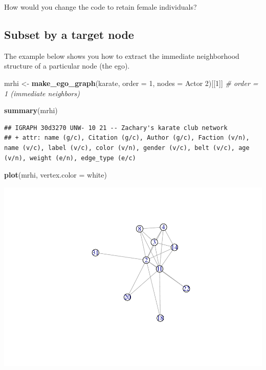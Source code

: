 \documentclass[
]{book}
\newenvironment{Shaded}{\begin{snugshade}}{\end{snugshade}}
\newcommand{\AttributeTok}[1]{\textcolor[rgb]{0.13,0.29,0.53}{#1}}
\newcommand{\CommentTok}[1]{\textcolor[rgb]{0.56,0.35,0.01}{\textit{#1}}}
\newcommand{\DecValTok}[1]{\textcolor[rgb]{0.00,0.00,0.81}{#1}}
\newcommand{\FunctionTok}[1]{\textcolor[rgb]{0.13,0.29,0.53}{\textbf{#1}}}
\newcommand{\NormalTok}[1]{#1}
\newcommand{\OtherTok}[1]{\textcolor[rgb]{0.56,0.35,0.01}{#1}}
\newcommand{\StringTok}[1]{\textcolor[rgb]{0.31,0.60,0.02}{#1}}
\begin{document}
How would you change the code to retain female individuals?

\subsection{Subset by a target node}\label{subset-by-a-target-node}

The example below shows you how to extract the immediate neighborhood structure of a particular node (the ego).

\begin{Shaded}
\begin{Highlighting}[]
\NormalTok{mrhi }\OtherTok{\textless{}{-}} \FunctionTok{make\_ego\_graph}\NormalTok{(karate, }\AttributeTok{order =} \DecValTok{1}\NormalTok{, }\AttributeTok{nodes =} \StringTok{\textquotesingle{}Actor 2\textquotesingle{}}\NormalTok{)[[}\DecValTok{1}\NormalTok{]] }\CommentTok{\# order = 1 (immediate neighbors)}

\FunctionTok{summary}\NormalTok{(mrhi)}
\end{Highlighting}
\end{Shaded}

\begin{verbatim}
## IGRAPH 30d3270 UNW- 10 21 -- Zachary's karate club network
## + attr: name (g/c), Citation (g/c), Author (g/c), Faction (v/n), name (v/c), label (v/c), color (v/n), gender (v/c), belt (v/c), age (v/n), weight (e/n), edge_type (e/c)
\end{verbatim}

\begin{Shaded}
\begin{Highlighting}[]
\FunctionTok{plot}\NormalTok{(mrhi, }\AttributeTok{vertex.color =} \StringTok{\textquotesingle{}white\textquotesingle{}}\NormalTok{)}
\end{Highlighting}
\end{Shaded}

\includegraphics{bookdown-demo_files/figure-latex/unnamed-chunk-90-1.pdf}
\end{document}
